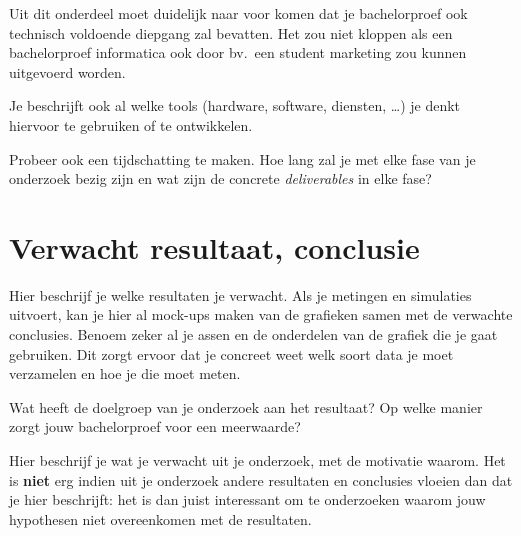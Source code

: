 Uit dit onderdeel moet duidelijk naar voor komen dat je bachelorproef ook technisch voldoen\-de diepgang zal bevatten. Het zou niet kloppen als een bachelorproef informatica ook door bv.\ een student marketing zou kunnen uitgevoerd worden.

Je beschrijft ook al welke tools (hardware, software, diensten, \ldots) je denkt hiervoor te gebruiken of te ontwikkelen.

Probeer ook een tijdschatting te maken. Hoe lang zal je met elke fase van je onderzoek bezig zijn en wat zijn de concrete \emph{deliverables} in elke fase?

\section{Verwacht resultaat, conclusie}%
\label{sec:verwachte_resultaten}

Hier beschrijf je welke resultaten je verwacht. Als je metingen en simulaties uitvoert, kan je hier al mock-ups maken van de grafieken samen met de verwachte conclusies. Benoem zeker al je assen en de onderdelen van de grafiek die je gaat gebruiken. Dit zorgt ervoor dat je concreet weet welk soort data je moet verzamelen en hoe je die moet meten.

Wat heeft de doelgroep van je onderzoek aan het resultaat? Op welke manier zorgt jouw bachelorproef voor een meerwaarde?

Hier beschrijf je wat je verwacht uit je onderzoek, met de motivatie waarom. Het is \textbf{niet} erg indien uit je onderzoek andere resultaten en conclusies vloeien dan dat je hier beschrijft: het is dan juist interessant om te onderzoeken waarom jouw hypothesen niet overeenkomen met de resultaten.

